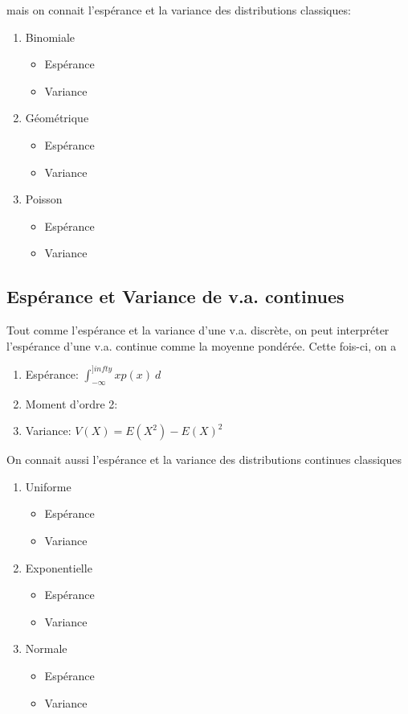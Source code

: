 \documentclass{article}
\begin{document}
mais on connait l'espérance et la variance des distributions classiques:
\begin{enumerate}
	\item Binomiale
	\begin{itemize}
	    \item Espérance
	    \item Variance
	\end{itemize}
	\item Géométrique
	\begin{itemize}
	    \item Espérance
	    \item Variance
	\end{itemize}
	\item Poisson
	\begin{itemize}
	    \item Espérance
	    \item Variance
	\end{itemize}
\end{enumerate}

\subsection{Espérance et Variance de v.a. continues}

Tout comme l'espérance et la variance d'une v.a. discrète, on peut
interpréter l'espérance d'une v.a. continue comme la moyenne pondérée.
Cette fois-ci, on a
\begin{enumerate}
    \item Espérance: $ \int_{{-\infty}}^{{]infty}} {x p(x)} \: d{} {}$
    \item Moment d'ordre 2:
    \item Variance: $V(X) = E(X^2) - E(X)^2 $
\end{enumerate}

On connait aussi l'espérance et la variance des distributions continues
classiques

\begin{enumerate}
	\item Uniforme
	\begin{itemize}
	    \item Espérance
	    \item Variance
	\end{itemize}
	\item Exponentielle
	\begin{itemize}
	    \item Espérance
	    \item Variance
	\end{itemize}
	\item Normale
	\begin{itemize}
	    \item Espérance
	    \item Variance
	\end{itemize}
\end{enumerate}
\end{document}
